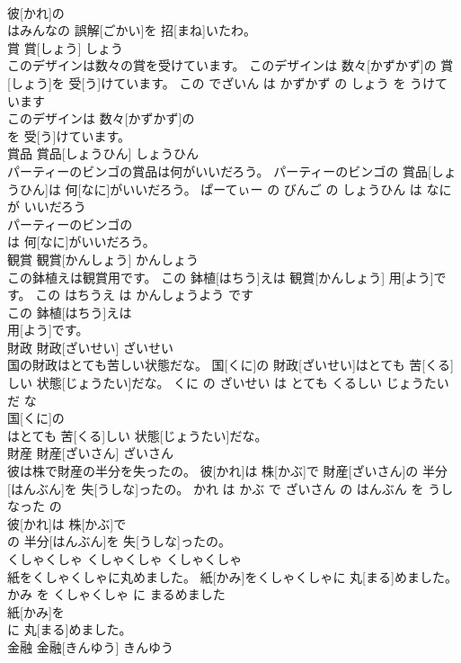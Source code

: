 \documentclass[8pt]{extreport}
\begin{document}
\begin{CJK}{UTF8}{min}
\\	彼[かれ]の
\\	はみんなの 誤解[ごかい]を 招[まね]いたわ。			
\\	賞	賞[しょう]	しょう	
\\	このデザインは数々の賞を受けています。	このデザインは 数々[かずかず]の 賞[しょう]を 受[う]けています。	この でざいん は かずかず の しょう を うけて います	
\\	このデザインは 数々[かずかず]の
\\	を 受[う]けています。			
\\	賞品	賞品[しょうひん]	しょうひん	
\\	パーティーのビンゴの賞品は何がいいだろう。	パーティーのビンゴの 賞品[しょうひん]は 何[なに]がいいだろう。	ぱーてぃー の びんご の しょうひん は なに が いいだろう	
\\	パーティーのビンゴの
\\	は 何[なに]がいいだろう。			
\\	観賞	観賞[かんしょう]	かんしょう	
\\	この鉢植えは観賞用です。	この 鉢植[はちう]えは 観賞[かんしょう] 用[よう]です。	この はちうえ は かんしょうよう です	
\\	この 鉢植[はちう]えは
\\	用[よう]です。			
\\	財政	財政[ざいせい]	ざいせい	
\\	国の財政はとても苦しい状態だな。	国[くに]の 財政[ざいせい]はとても 苦[くる]しい 状態[じょうたい]だな。	くに の ざいせい は とても くるしい じょうたい だ な	
\\	国[くに]の
\\	はとても 苦[くる]しい 状態[じょうたい]だな。			
\\	財産	財産[ざいさん]	ざいさん	
\\	彼は株で財産の半分を失ったの。	彼[かれ]は 株[かぶ]で 財産[ざいさん]の 半分[はんぶん]を 失[うしな]ったの。	かれ は かぶ で ざいさん の はんぶん を うしなった の	
\\	彼[かれ]は 株[かぶ]で
\\	の 半分[はんぶん]を 失[うしな]ったの。			
\\	くしゃくしゃ	くしゃくしゃ	くしゃくしゃ	
\\	紙をくしゃくしゃに丸めました。	紙[かみ]をくしゃくしゃに 丸[まる]めました。	かみ を くしゃくしゃ に まるめました	
\\	紙[かみ]を
\\	に 丸[まる]めました。			
\\	金融	金融[きんゆう]	きんゆう	

\end{CJK}
\end{document}
